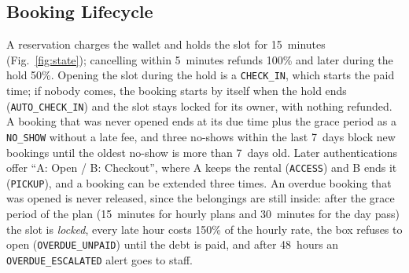 \subsection{Booking Lifecycle}

A reservation charges the wallet and holds the slot for 15~minutes (Fig.~\ref{fig:state}); cancelling within
5~minutes refunds 100\% and later during the hold 50\%. Opening the slot during the hold is a \texttt{CHECK\_IN}, which
starts the paid time; if nobody comes, the booking starts by itself when the hold ends (\texttt{AUTO\_CHECK\_IN}) and
the slot stays locked for its owner, with nothing refunded. A booking that was never opened ends at its due time plus
the grace period as a \texttt{NO\_SHOW} without a late fee, and three no-shows within the last 7~days block new bookings
until the oldest no-show is more than 7~days old. Later authentications offer ``A: Open / B: Checkout'', where A keeps the
rental (\texttt{ACCESS}) and B ends it (\texttt{PICKUP}), and a booking can be extended three times. An overdue booking
that was opened is never released, since the belongings are still inside: after the grace period of the plan (15~minutes
for hourly plans and 30~minutes for the day pass) the slot is \emph{locked}, every late hour costs 150\% of the hourly rate,
the box refuses to open (\texttt{OVERDUE\_UNPAID}) until the debt is paid, and after 48~hours an \texttt{OVERDUE\_ESCALATED}
alert goes to staff.

